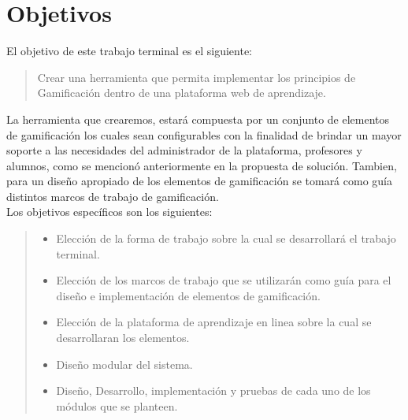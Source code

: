 \clearpage
\section{Objetivos}
\label{sec:objetivos}

\noindent El objetivo de este trabajo terminal es el siguiente:

    \begin{quote}
    \colorbox{blue!05}{\parbox{\dimexpr\linewidth-2\fboxsep}{\strut
        Crear una herramienta que permita implementar los principios
        de Gamificación dentro de una plataforma web de aprendizaje.
    \strut}}
    \end{quote}

\noindent La herramienta que crearemos, estará compuesta por un conjunto de elementos de gamificación los cuales sean configurables con la finalidad de brindar un mayor soporte a las necesidades del administrador de la plataforma, profesores y alumnos, como se mencionó anteriormente en la propuesta de solución. Tambien, para un diseño apropiado de los elementos de gamificación se tomará como guía distintos marcos de trabajo de gamificación.\\

Los objetivos específicos son los siguientes:

    \begin{quote}
    \begin{itemize}%
        \item Elección de la forma de trabajo sobre la cual se
              desarrollará el trabajo terminal.
              
        \item Elección de los marcos de trabajo que se utilizarán como
              guía para el diseño e implementación de elementos de gamificación.
        
        \item Elección de la plataforma de aprendizaje en linea sobre
              la cual se desarrollaran los elementos.
              
        \item Diseño modular del sistema.
        
        \item Diseño, Desarrollo, implementación y pruebas de cada uno de
              los módulos que se planteen.
    \end{itemize}
    \end{quote}


